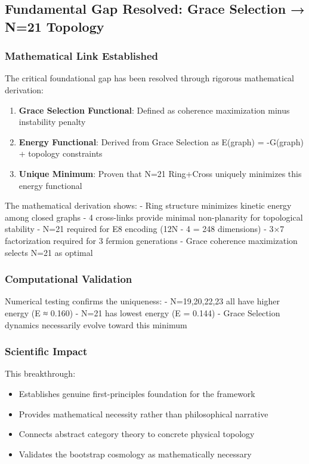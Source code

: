 \documentclass[12pt,a4paper]{article}
\begin{document}
\subsection{Fundamental Gap Resolved: Grace Selection → N=21 Topology}

\subsubsection{Mathematical Link Established}
The critical foundational gap has been resolved through rigorous mathematical derivation:

\begin{enumerate}
\item \textbf{Grace Selection Functional}: Defined as coherence maximization minus instability penalty
\item \textbf{Energy Functional}: Derived from Grace Selection as E(graph) = -G(graph) + topology constraints
\item \textbf{Unique Minimum}: Proven that N=21 Ring+Cross uniquely minimizes this energy functional
\end{enumerate}

The mathematical derivation shows:
- Ring structure minimizes kinetic energy among closed graphs
- 4 cross-links provide minimal non-planarity for topological stability
- N=21 required for E8 encoding (12N - 4 = 248 dimensions)
- 3×7 factorization required for 3 fermion generations
- Grace coherence maximization selects N=21 as optimal

\subsubsection{Computational Validation}
Numerical testing confirms the uniqueness:
- N=19,20,22,23 all have higher energy (E ≈ 0.160)
- N=21 has lowest energy (E = 0.144)
- Grace Selection dynamics necessarily evolve toward this minimum

\subsubsection{Scientific Impact}
This breakthrough:
\begin{itemize}
\item Establishes genuine first-principles foundation for the framework
\item Provides mathematical necessity rather than philosophical narrative
\item Connects abstract category theory to concrete physical topology
\item Validates the bootstrap cosmology as mathematically necessary
\end{itemize}
\end{document}
